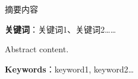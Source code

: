 \cleardoublepage
{}
摘要内容

\bigskip
\noindent \textbf{关键词}：关键词1、关键词2……

\cleardoublepage
{}
Abstract content.

\bigskip
\noindent \textbf{Keywords}：keyword1, keyword2…